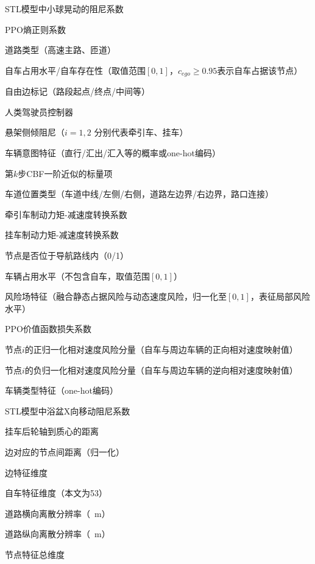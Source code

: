 \begin{denotation}[3cm]
  \item[{$c_{damp}$}] STL模型中小球晃动的阻尼系数
  \item[{$c_e$}] PPO熵正则系数
  \item[{$c_{edge}$}] 道路类型（高速主路、匝道）
  \item[{$c_{ego}$}] 自车占用水平/自车存在性（取值范围$[0,1]$，$c_{ego}\ge0.95$表示自车占据该节点）
  \item[{$c_{free}$}] 自由边标记（路段起点/终点/中间等）
  \item[{$\mathcal{C}_{\text{human}}$}] 人类驾驶员控制器
  \item[$c_i$] 悬架侧倾阻尼（$i=1,2$ 分别代表牵引车、挂车）
  \item[{$c_{int}$}] 车辆意图特征（直行/汇出/汇入等的概率或one-hot编码）
  \item[{$c_k^x(x_k)$}] 第$k$步CBF一阶近似的标量项
  \item[{$c_{lane}$}] 车道位置类型（车道中线/左侧/右侧，道路左边界/右边界，路口连接）
  \item[$c_{M1}$] 牵引车制动力矩-减速度转换系数
  \item[$c_{M2}$] 挂车制动力矩-减速度转换系数
  \item[{$c_{nav}$}] 节点是否位于导航路线内（0/1）
  \item[{$c_{occ}$}] 车辆占用水平（不包含自车，取值范围$[0,1]$）
  \item[{$c_{risk}$}] 风险场特征（融合静态占据风险与动态速度风险，归一化至$[0,1]$，表征局部风险水平）
  \item[{$c_v$}] PPO价值函数损失系数
  \item[{$c_v^+(i)$}] 节点$i$的正归一化相对速度风险分量（自车与周边车辆的正向相对速度映射值）
  \item[{$c_v^-(i)$}] 节点$i$的负归一化相对速度风险分量（自车与周边车辆的逆向相对速度映射值）
  \item[{$c_{veh}$}] 车辆类型特征（one-hot编码）
  \item[{$c_x$}] STL模型中浴盆X向移动阻尼系数
  \item[$d$] 挂车后轮轴到质心的距离
  \item[{$d_{con}$}] 边对应的节点间距离（归一化）
  \item[{$d_\mathrm{e}$}] 边特征维度
  \item[$d_{ego}$] 自车特征维度（本文为53）
  \item[$d_{lat}$] 道路横向离散分辨率（\SI{}{m}）
  \item[$d_{lon}$] 道路纵向离散分辨率（\SI{}{m}）
  \item[{$d_{\mathrm{v}}$}] 节点特征总维度

\end{denotation}
